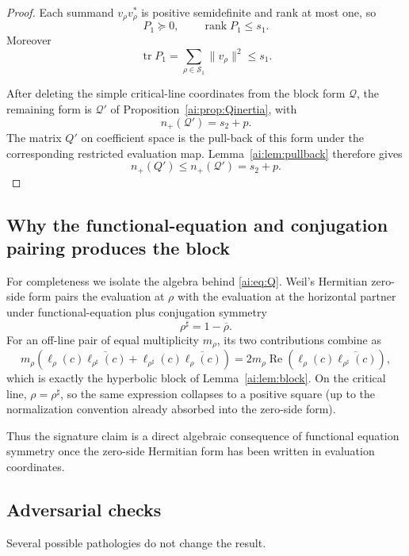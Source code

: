 \documentclass[11pt]{article}
\DeclareMathOperator{\tr}{tr}
\DeclareMathOperator{\rank}{rank}
\newcommand{\cS}{\mathcal S}
\begin{document}
\begin{proof}
Each summand $v_\rho v_\rho^*$ is positive semidefinite and rank at most one,
so
\[
 P_1\succeq0,\qquad \rank P_1\le s_1.
\]
Moreover
\[
 \tr P_1
 =
 \sum_{\rho\in\cS_1}\|v_\rho\|^2
 \le s_1.
\]

After deleting the simple critical-line coordinates from the block form
$\mathcal Q$, the remaining form is $\mathcal Q'$ of
Proposition~\ref{ai:prop:Qinertia}, with
\[
 n_+(\mathcal Q')=s_2+p.
\]
The matrix $Q'$ on coefficient space is the pull-back of this form under the
corresponding restricted evaluation map.  Lemma~\ref{ai:lem:pullback} therefore
gives
\[
 n_+(Q')\le n_+(\mathcal Q')=s_2+p.
\]
\end{proof}

\subsection{Why the functional-equation and conjugation pairing produces the block}

For completeness we isolate the algebra behind \eqref{ai:eq:Q}.  Weil's
Hermitian zero-side form pairs the evaluation at $\rho$ with the evaluation
at the horizontal partner under functional-equation plus conjugation symmetry
\[
 \rho^\sharp=1-\overline\rho.
\]
For an off-line pair of equal multiplicity $m_\rho$, its two contributions
combine as
\[
 m_\rho
 \left(
 \ell_\rho(c)\overline{\ell_{\rho^\sharp}(c)}
 +
 \ell_{\rho^\sharp}(c)\overline{\ell_\rho(c)}
 \right)
 =
 2m_\rho\operatorname{Re}
 \left(
 \ell_\rho(c)
 \overline{\ell_{\rho^\sharp}(c)}
 \right),
\]
which is exactly the hyperbolic block of Lemma~\ref{ai:lem:block}.  On the
critical line, $\rho=\rho^\sharp$, so the same expression collapses to a
positive square (up to the normalization convention already absorbed into
the zero-side form).

Thus the signature claim is a direct algebraic consequence of functional
equation symmetry once the zero-side Hermitian form has been written in
evaluation coordinates.

\subsection{Adversarial checks}

Several possible pathologies do not change the result.
\end{document}
